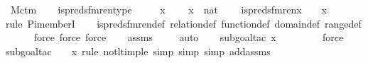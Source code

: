 \begin{isabellebody}
\isanewline
{}\isamarkupfalse%
\ M{\isacharunderscore}{\kern0pt}ctm\ \isanewline
{}\ \isanewline
\isanewline
{}\isamarkupfalse%
\ is{\isacharunderscore}{\kern0pt}preds{\isacharunderscore}{\kern0pt}fm{\isacharunderscore}{\kern0pt}ren{\isacharunderscore}{\kern0pt}type\ {\isacharcolon}{\kern0pt}\ \isanewline
\ \ \ x\ \isanewline
\ \ \ {\isachardoublequoteopen}x\ {\isasymin}\ nat{\isachardoublequoteclose}\ \isanewline
\ \ \ {\isachardoublequoteopen}is{\isacharunderscore}{\kern0pt}preds{\isacharunderscore}{\kern0pt}fm{\isacharunderscore}{\kern0pt}ren{\isacharparenleft}{\kern0pt}x{\isacharparenright}{\kern0pt}\ {\isasymin}\ {}\ {\isasymrightarrow}\ {\isacharparenleft}{\kern0pt}x\ {\isacharhash}{\kern0pt}{\isacharplus}{\kern0pt}\ {}{\isacharparenright}{\kern0pt}{\isachardoublequoteclose}\ \isanewline
%
\isadelimproof
\ \ %
\endisadelimproof
%
\isatagproof
{}\isamarkupfalse%
{\isacharparenleft}{\kern0pt}rule\ Pi{\isacharunderscore}{\kern0pt}memberI{\isacharparenright}{\kern0pt}\isanewline
\ \ \isamarkupfalse%
\ is{\isacharunderscore}{\kern0pt}preds{\isacharunderscore}{\kern0pt}fm{\isacharunderscore}{\kern0pt}ren{\isacharunderscore}{\kern0pt}def\ relation{\isacharunderscore}{\kern0pt}def\ function{\isacharunderscore}{\kern0pt}def\ domain{\isacharunderscore}{\kern0pt}def\ range{\isacharunderscore}{\kern0pt}def\isanewline
\ \ \ \ \ \isamarkupfalse%
{\isacharparenleft}{\kern0pt}force{\isacharcomma}{\kern0pt}\ force{\isacharcomma}{\kern0pt}\ force{\isacharparenright}{\kern0pt}\isanewline
\ \ \isamarkupfalse%
\ assms\ \isanewline
\ \ \isamarkupfalse%
\ auto\isanewline
\ \ \ \isamarkupfalse%
{\isacharparenleft}{\kern0pt}subgoal{\isacharunderscore}{\kern0pt}tac\ {\isachardoublequoteopen}x\ {\isasymle}\ {}{\isachardoublequoteclose}{\isacharparenright}{\kern0pt}\ \isanewline
\ \ \ \ \isamarkupfalse%
\ force\isanewline
\ \ \isamarkupfalse%
{\isacharparenleft}{\kern0pt}subgoal{\isacharunderscore}{\kern0pt}tac\ {\isachardoublequoteopen}{\isasymnot}\ {}\ {\isacharless}{\kern0pt}\ x{\isachardoublequoteclose}{\isacharcomma}{\kern0pt}\ rule\ not{\isacharunderscore}{\kern0pt}lt{\isacharunderscore}{\kern0pt}imp{\isacharunderscore}{\kern0pt}le{\isacharcomma}{\kern0pt}\ simp{\isacharcomma}{\kern0pt}\ simp{\isacharcomma}{\kern0pt}\ simp\ add{\isacharcolon}{\kern0pt}assms{\isacharparenright}{\kern0pt}\isanewline

\end{isabellebody}
